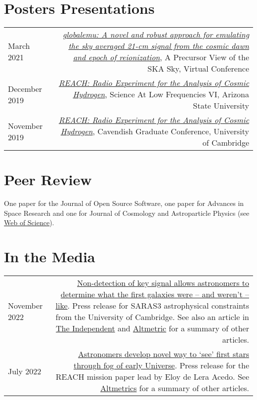 \documentclass{article}
\begin{document}
\section*{Posters Presentations}

\begin{tabular}{L!{\vrule}R}
	March 2021 & \href{https://github.com/htjb/Talks/blob/master/Posters/SKA_globalemu_March_2021/globalemu.pdf}{\textit{globalemu: A novel and robust approach for emulating the sky averaged 21-cm signal from the cosmic dawn and epoch of reionization}}, A Precursor View of the SKA Sky, Virtual Conference\\
	December 2019 & \href{https://drive.google.com/file/d/1dvgumyu4cXxXqoYxikU3DKOa4u_gpGzn/view}{\textit{REACH: Radio Experiment for the Analysis of Cosmic Hydrogen}}, Science At Low Frequencies VI, Arizona State University \\
	November 2019 & \href{https://github.com/htjb/Talks/blob/master/Posters/Cav_Graduate_Conf_REACH_Nov_2019/REACH_poster.pdf}{\textit{REACH: Radio Experiment for the Analysis of Cosmic Hydrogen}}, Cavendish Graduate Conference, University of Cambridge
\end{tabular}

\section*{Peer Review}
One paper for the Journal of Open Source Software, one paper for Advances in Space Research and one for Journal of Cosmology and Astroparticle Physics (see \href{https://www.webofscience.com/wos/author/record/3920858}{Web of Science}).

\section*{In the Media}

\begin{tabular}{L!{\vrule}R}
	November 2022 & \href{https://www.cam.ac.uk/research/news/non-detection-of-key-signal-allows-astronomers-to-determine-what-the-first-galaxies-were-and-werent}{Non-detection of key signal allows astronomers to determine what the first galaxies were – and weren’t – like}. Press release for SARAS3 astrophysical constraints from the University of Cambridge. See also an article in \href{https://www.independent.co.uk/space/galaxies-beginning-cosmic-dawn-signal-b2234570.html?amp}{The Independent} and \href{https://nature.altmetric.com/details/139089769/news}{Altmetric} for a summary of other articles. \\
	July 2022 & \href{https://www.cam.ac.uk/research/news/astronomers-develop-novel-way-to-see-the-first-stars-through-the-fog-of-the-early-universe}{Astronomers develop novel way to ‘see’ first stars through fog of early Universe}. Press release for the REACH mission paper lead by Eloy de Lera Acedo. See \href{https://nature.altmetric.com/details/132932581/news}{Altmetrics} for a summary of other articles.
\end{tabular}
\end{document}
